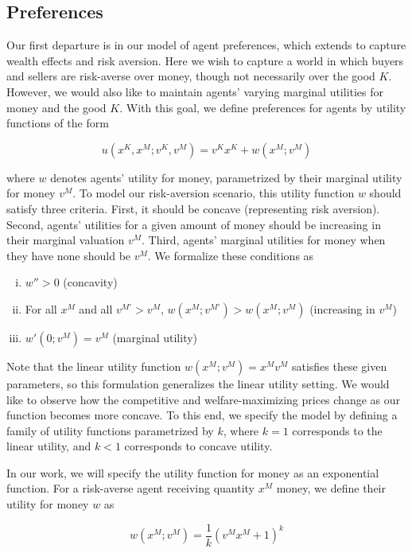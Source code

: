 \documentclass[AER]{AEA}
\begin{document}
\subsection{Preferences}

Our first departure is in our model of agent preferences, which extends \cite{dworczak-2020} to capture wealth effects and risk aversion. Here we wish to capture a world in which buyers and sellers are risk-averse over money, though not necessarily over the good $K$. However, we would also like to maintain agents' varying marginal utilities for money and the good $K$. With this goal, we define preferences for agents by utility functions of the form

$$
u(x^K, x^M; v^K, v^M) = v^K x^K + w(x^M; v^M)
$$

where $w$ denotes agents' utility for money, parametrized by their marginal utility for money $v^M$. To model our risk-aversion scenario, this utility function $w$ should satisfy three criteria. First, it should be concave (representing risk aversion). Second, agents' utilities for a given amount of money should be increasing in their marginal valuation $v^M$. Third, agents' marginal utilities for money when they have none should be $v^M$. We formalize these conditions as

\begin{enumerate}[(i)]
    \item $w'' > 0$ (concavity)
    \item For all $x^M$ and all $v^{M'} > v^M$, $w(x^M; v^{M'}) > w(x^M; v^M)$ (increasing in $v^M$)
    \item $w'(0; v^M) = v^M$ (marginal utility)
\end{enumerate}

Note that the linear utility function $w(x^M; v^M) = x^M v^M$ satisfies these given parameters, so this formulation generalizes the linear utility setting. We would like to observe how the competitive and welfare-maximizing prices change as our function becomes more concave. To this end, we specify the model by defining a family of utility functions parametrized by $k$, where $k=1$ corresponds to the linear utility, and $k < 1$ corresponds to concave utility. 

In our work, we will specify the utility function for money as an exponential function. For a risk-averse agent receiving  quantity $x^M$ money, we define their utility for money $w$ as

$$
w(x^M; v^M) =  \frac{1}{k}(v^M x^M + 1)^k
$$
\end{document}
